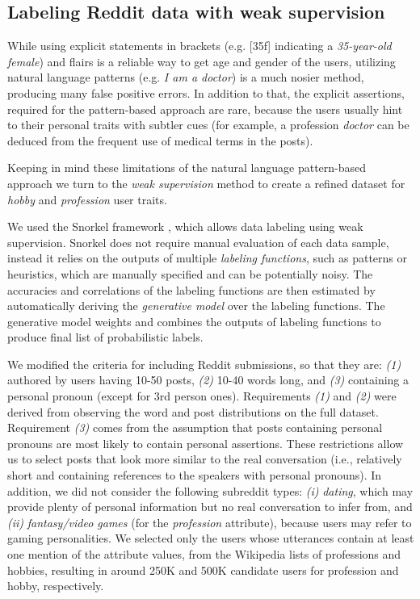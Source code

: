 
\subsection{Labeling Reddit data with weak supervision}

While using explicit statements in brackets (e.g. [35f] indicating a \textit{35-year-old female}) and flairs is a reliable way to get age and gender of the users, utilizing natural language patterns (e.g. \textit{I am a doctor}) is a much nosier method, producing many false positive errors. In addition to that, the explicit assertions, required for the pattern-based approach are rare, because the users usually hint to their personal traits with subtler cues (for example, a profession \textit{doctor} can be deduced from the frequent use of medical terms in the posts). 

Keeping in mind these limitations of the natural language pattern-based approach we turn to the \textit{weak supervision} method to create a refined dataset for \textit{hobby} and \textit{profession} user traits. 

 We used the Snorkel framework \cite{ratner2017snorkel}, which allows data labeling using weak supervision. 
Snorkel does not require manual evaluation of each data sample, instead it relies on the outputs of multiple \textit{labeling functions}, such as patterns or heuristics, which are manually specified and can be potentially noisy. The accuracies and correlations of the labeling functions are then estimated by automatically deriving the \textit{generative model} over the labeling functions. The generative model weights and combines the outputs of labeling functions to produce final list of probabilistic labels.

\vspace{10pt}

We modified the criteria for including Reddit submissions, so that they are:
\emph{(1)} authored by users having 10-50 posts, \emph{(2)} 10-40 words long, and \emph{(3)} containing a personal pronoun (except for 3rd person ones).
Requirements \emph{(1)} and \emph{(2)} were derived from observing the word and post distributions on the full dataset.
Requirement \emph{(3)} comes from the assumption that posts containing personal pronouns are most likely to contain personal assertions. These restrictions allow us to select posts that look more similar to the real conversation (i.e., relatively short and containing references to the speakers with personal pronouns).
In addition, we did not consider the following subreddit types: \emph{(i)} \emph{dating}, which may provide plenty of personal information but no real conversation to infer from,
and \emph{(ii)} \emph{fantasy/video games} (for the \emph{profession} attribute), because users may refer to gaming personalities.
We selected only the users whose utterances contain at least one mention of the attribute values, from the Wikipedia lists of professions and hobbies,
resulting in around 250K and 500K candidate users for profession and hobby, respectively.

